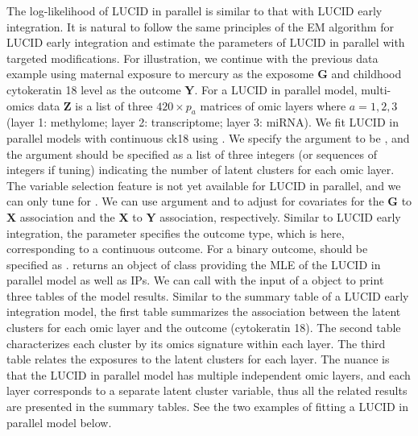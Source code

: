 The log-likelihood of LUCID in parallel is similar to that with LUCID early integration. It is natural to follow the same principles of the EM algorithm for LUCID early integration and estimate the parameters of LUCID in parallel with targeted modifications.
For illustration, we continue with the previous data example using maternal exposure to mercury as the exposome $\bm G$ and childhood cytokeratin 18 level as the outcome $\bm Y$. For a LUCID in parallel model, multi-omics data $\bm Z$ is a list of three $420 \times p_a$ matrices of omic layers where $a = 1, 2, 3$ (layer 1: methylome; layer 2: transcriptome; layer 3: miRNA). We fit LUCID in parallel models with continuous ck18 using . We specify the argument  to be , and the argument  should be specified as a list of three integers (or sequences of integers if tuning) indicating the number of latent clusters for each omic layer. The variable selection feature is not yet available for LUCID in parallel, and we can only tune for . We can use argument  and  to adjust for covariates for the $\bm G$ to $\bm X$ association and the $\bm X$ to $\bm Y$ association, respectively. Similar to LUCID early integration, the parameter  specifies the outcome type, which is  here, corresponding to a continuous outcome. For a binary outcome,  should be specified as .  returns an object of class  providing the MLE of the LUCID in parallel model as well as IPs. We can call  with the input of a  object to print three tables of the model results. Similar to the summary table of a LUCID early integration model, the first table summarizes the association between the latent clusters for each omic layer and the outcome (cytokeratin 18). The second table characterizes each cluster by its omics signature within each layer. The third table relates the exposures to the latent clusters for each layer. The nuance is that the LUCID in parallel model has multiple independent omic layers, and each layer corresponds to a separate latent cluster variable, thus all the related results are presented in the summary tables. See the two examples of fitting a LUCID in parallel model below.
